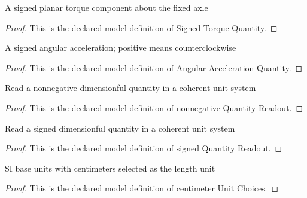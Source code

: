 \begin{definition}
  \label{def:physics:phyx-mini-0705:phyxminiproblems-problemphyxmini0705-signedtorquequantity}
  A signed planar torque component about the fixed axle
\end{definition}
\begin{proof}
  This is the declared model definition of Signed Torque Quantity.
\end{proof}
\begin{definition}
  \label{def:physics:phyx-mini-0705:phyxminiproblems-problemphyxmini0705-angularaccelerationquantity}
  A signed angular acceleration; positive means counterclockwise
\end{definition}
\begin{proof}
  This is the declared model definition of Angular Acceleration Quantity.
\end{proof}
\begin{definition}
  \label{def:physics:phyx-mini-0705:phyxminiproblems-problemphyxmini0705-nonnegativequantityreadout}
  Read a nonnegative dimensionful quantity in a coherent unit system
\end{definition}
\begin{proof}
  This is the declared model definition of nonnegative Quantity Readout.
\end{proof}
\begin{definition}
  \label{def:physics:phyx-mini-0705:phyxminiproblems-problemphyxmini0705-signedquantityreadout}
  Read a signed dimensionful quantity in a coherent unit system
\end{definition}
\begin{proof}
  This is the declared model definition of signed Quantity Readout.
\end{proof}
\begin{definition}
  \label{def:physics:phyx-mini-0705:phyxminiproblems-problemphyxmini0705-centimeterunitchoices}
  SI base units with centimeters selected as the length unit
\end{definition}
\begin{proof}
  This is the declared model definition of centimeter Unit Choices.
\end{proof}
